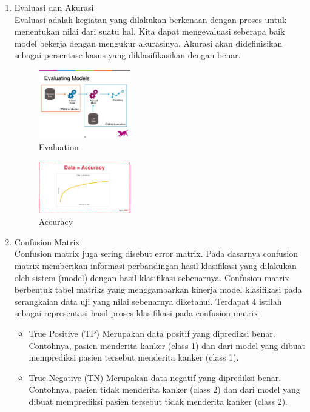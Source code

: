 \begin{enumerate}
\begin{itemize}
\end{itemize}

\item Evaluasi dan Akurasi \\
Evaluasi adalah kegiatan yang dilakukan berkenaan dengan proses untuk menentukan nilai dari suatu hal.
Kita dapat mengevaluasi seberapa baik model bekerja dengan mengukur akurasinya. 
Akurasi akan didefinisikan sebagai persentase kasus yang diklasifikasikan dengan benar.

\begin{figure}[H]
    \includegraphics[width=4cm]{figures/1174086/2/eva.jpg}
    \centering
    \caption{Evaluation}
\end{figure}
\begin{figure}[H]
    \includegraphics[width=4cm]{figures/1174086/2/acc.jpg}
    \centering
    \caption{Accuracy}
\end{figure}
\item Confusion Matrix \\
Confusion matrix juga sering disebut error matrix. Pada dasarnya confusion matrix memberikan informasi perbandingan hasil klasifikasi yang dilakukan oleh sistem (model) dengan hasil klasifikasi sebenarnya. Confusion matrix berbentuk tabel matriks yang menggambarkan kinerja model klasifikasi pada serangkaian data uji yang nilai sebenarnya diketahui.
Terdapat 4 istilah sebagai representasi hasil proses klasifikasi pada confusion matrix
\begin{itemize}
\item True Positive (TP)
Merupakan data positif yang diprediksi benar. Contohnya, pasien menderita kanker (class 1) dan dari model yang dibuat memprediksi pasien tersebut menderita kanker (class 1).
\item True Negative (TN)
Merupakan data negatif yang diprediksi benar. Contohnya, pasien tidak menderita kanker (class 2) dan dari model yang dibuat memprediksi pasien tersebut tidak menderita kanker (class 2).

\end{itemize}
\end{enumerate}
